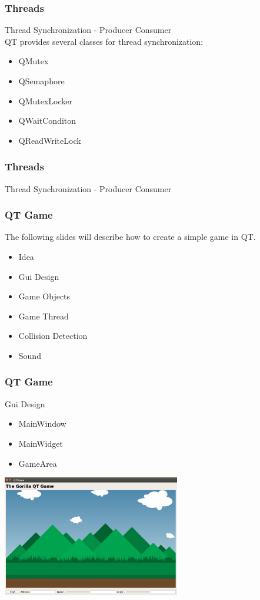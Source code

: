 \begin{frame}[fragile]
\frametitle{Threads}
Thread Synchronization - Producer Consumer\\
QT provides several classes for thread synchronization:
\begin{itemize}
\item QMutex
\item QSemaphore
\item QMutexLocker
\item QWaitConditon
\item QReadWriteLock
\end{itemize}

\end{frame}

\begin{frame}[fragile]
\frametitle{Threads}
Thread Synchronization - Producer Consumer\\
{\tiny

}

\end{frame}

\begin{frame}[fragile]
\frametitle{QT Game}
The following slides will describe how to create a simple game in QT.
\begin{itemize}
\item Idea
\item Gui Design
\item Game Objects
\item Game Thread
\item Collision Detection
\item Sound
\end{itemize}
\end{frame}

\begin{frame}[fragile]
\frametitle{QT Game}
Gui Design
\begin{itemize}
\item MainWindow
\item MainWidget
\item GameArea
\end{itemize}
\includegraphics[width=220pt]{img/qtgamegui.png}
\end{frame}

